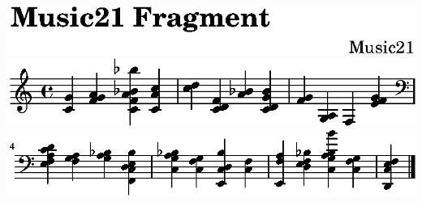\includegraphics{../examples/bwv1/c7/lily-6fc7e149-1}%
\ifx\betweenLilyPondSystem \undefined
  \linebreak
\else
  \expandafter{}%
\fi
\includegraphics{../examples/bwv1/c7/lily-6fc7e149-2}%
\ifx\betweenLilyPondSystem \undefined
  \linebreak
\else
  \expandafter{}%
\fi
\includegraphics{../examples/bwv1/c7/lily-6fc7e149-3}%
